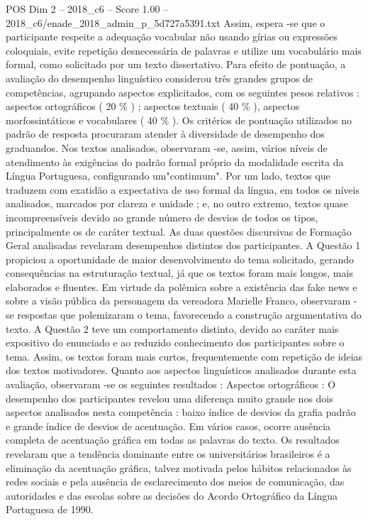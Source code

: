 \begin{textsample}{POS Dim 2 – 2018\_c6 – Score 1.00 – 2018\_c6/enade\_2018\_admin\_p\_5d727a5391.txt}
Assim, espera -se que o participante respeite a adequação vocabular não usando gírias ou expressões coloquiais, evite repetição desnecessária de palavras e utilize um vocabulário mais formal, como solicitado por um texto dissertativo.
Para efeito de pontuação, a avaliação do desempenho linguístico considerou três grandes grupos de competências, agrupando aspectos explicitados, com os seguintes pesos relativos : aspectos ortográficos ( 20 \% ) ; aspectos textuais ( 40 \% ), aspectos morfossintáticos e vocabulares ( 40 \% ).
Os critérios de pontuação utilizados no padrão de resposta procuraram atender à diversidade de desempenho dos graduandos.
Nos textos analisados, observaram -se, assim, vários níveis de atendimento às exigências do padrão formal próprio da modalidade escrita da Língua Portuguesa, configurando um"continuum".
Por um lado, textos que traduzem com exatidão a expectativa de uso formal da língua, em todos os níveis analisados, marcados por clareza e unidade ; e, no outro extremo, textos quase incompreensíveis devido ao grande número de desvios de todos os tipos, principalmente os de caráter textual.
As duas questões discursivas de Formação Geral analisadas revelaram desempenhos distintos dos participantes.
A Questão 1 propiciou a oportunidade de maior desenvolvimento do tema solicitado, gerando consequências na estruturação textual, já que os textos foram mais longos, mais elaborados e fluentes.
Em virtude da polêmica sobre a existência das fake news e sobre a visão pública da personagem da vereadora Marielle Franco, observaram -se respostas que polemizaram o tema, favorecendo a construção argumentativa do texto.
A Questão 2 teve um comportamento distinto, devido ao caráter mais expositivo do enunciado e ao reduzido conhecimento dos participantes sobre o tema.
Assim, os textos foram mais curtos, frequentemente com repetição de ideias dos textos motivadores.
Quanto aos aspectos linguísticos analisados durante esta avaliação, observaram -se os seguintes resultados : Aspectos ortográficos : O desempenho dos participantes revelou uma diferença muito grande nos dois aspectos analisados nesta competência : baixo índice de desvios da grafia padrão e grande índice de desvios de acentuação.
Em vários casos, ocorre ausência completa de acentuação gráfica em todas as palavras do texto.
Os resultados revelaram que a tendência dominante entre os universitários brasileiros é a eliminação da acentuação gráfica, talvez motivada pelos hábitos relacionados às redes sociais e pela ausência de esclarecimento dos meios de comunicação, das autoridades e das escolas sobre as decisões do Acordo Ortográfico da Língua Portuguesa de 1990.

\end{textsample}
